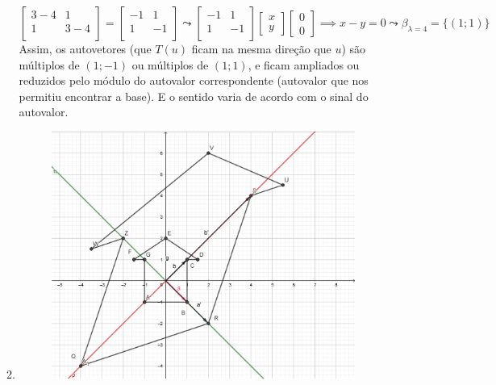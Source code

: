 \documentclass[english,ngerman,parskip=half]{scrartcl}
\begin{document}
\begin{enumerate}
\begin{enumerate}
                \begin{equation}
                    \begin{bmatrix}
                        3 - 4 & 1 \\
                        1 & 3 - 4 \\
                    \end{bmatrix}
                    =
                    \begin{bmatrix}
                        -1 & 1 \\
                        1 & -1 \\
                    \end{bmatrix}
                    \leadsto 
                    \begin{bmatrix}
                        -1 & 1 \\
                        1 & -1 \\
                    \end{bmatrix}
                    \begin{bmatrix}
                        x \\
                        y
                    \end{bmatrix}
                    \begin{bmatrix}
                        0 \\
                        0
                    \end{bmatrix}
                    \implies x - y = 0 \leadsto \beta_{\lambda=4} = \{(1;1)\}
                \end{equation}
                Assim, os autovetores (que $T(u)$ ficam na mesma direção que $u$) são múltiplos de $(1;-1)$ ou múltiplos de $(1;1)$,
                e ficam ampliados ou reduzidos pelo módulo do autovalor correspondente (autovalor que nos permitiu encontrar a base).
                E o sentido varia de acordo com o sinal do autovalor.
            \item
            \begin{figure}[ht!]
                \centering
                \includegraphics[width=100mm]{./images/ex4-final.png}

\end{figure}
\end{enumerate}
\end{enumerate}
\end{document}
